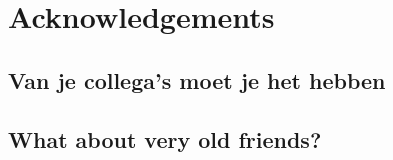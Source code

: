 
\chapter*{Acknowledgements}



\section*{Van je collega's moet je het hebben}
%
%
%
%
%
%

\section*{What about very old friends?}
%
%
%
%
%
%

